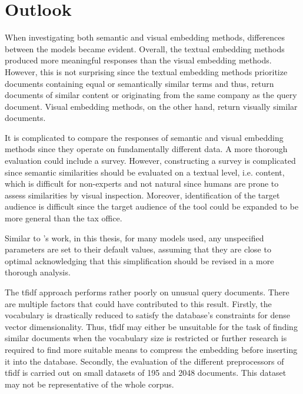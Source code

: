 \section{Outlook}\label{sec:outlook}

When investigating both semantic and visual embedding methods, differences between the models became evident.
Overall, the textual embedding methods produced more meaningful responses than the visual embedding methods.
However, this is not surprising since the textual embedding methods prioritize documents containing equal or semantically similar terms and thus,
return documents of similar content or originating from the same company as the query document.
Visual embedding methods, on the other hand, return visually similar documents.

It is complicated to compare the responses of semantic and visual embedding methods since they operate on fundamentally different data.
A more thorough evaluation could include a survey.
However, constructing a survey is complicated since semantic similarities should be evaluated on a textual level, i.e. content, 
which is difficult for non-experts and not natural since humans are prone to assess similarities by visual inspection.
Moreover, identification of the target audience is difficult since the target audience of the tool could be expanded to be more general than the tax office.


Similar to \citeauthor{glove2014}'s work, in this thesis, for many models used, any unspecified parameters are set to their default values, 
assuming that they are close to optimal
acknowledging that this simplification should be revised in a more thorough analysis.

The \ac{tfidf} approach performs rather poorly on unusual query documents.
There are multiple factors that could have contributed to this result.
Firstly, the vocabulary is drastically reduced to satisfy the database's constraints for dense vector dimensionality.
Thus, \ac{tfidf} may either be unsuitable for the task of finding similar documents when the vocabulary size is restricted or 
further research is required to find more suitable means to compress the embedding before inserting it into the database.
Secondly, the evaluation of the different preprocessors of \ac{tfidf} is carried out on small datasets of 195 and 2048 documents.
This dataset may not be representative of the whole corpus.

